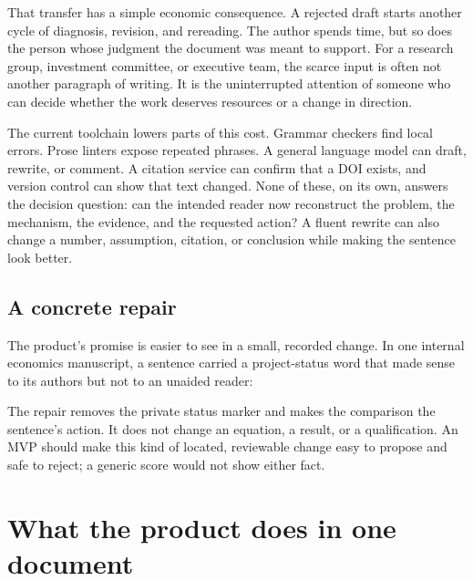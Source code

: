 That transfer has a simple economic consequence. A rejected draft starts
another cycle of diagnosis, revision, and rereading. The author spends time,
but so does the person whose judgment the document was meant to support. For a
research group, investment committee, or executive team, the scarce input is
often not another paragraph of writing. It is the uninterrupted attention of
someone who can decide whether the work deserves resources or a change in
direction.

The current toolchain lowers parts of this cost. Grammar checkers find local
errors. Prose linters expose repeated phrases. A general language model can
draft, rewrite, or comment. A citation service can confirm that a DOI exists,
and version control can show that text changed. None of these, on its own,
answers the decision question: can the intended reader now reconstruct the
problem, the mechanism, the evidence, and the requested action? A fluent
rewrite can also change a number, assumption, citation, or conclusion while
making the sentence look better.

\subsection{A concrete repair}

The product's promise is easier to see in a small, recorded change. In one
internal economics manuscript, a sentence carried a project-status word that
made sense to its authors but not to an unaided reader:

\begin{repairpair}
\end{repairpair}

The repair removes the private status marker and makes the comparison the
sentence's action. It does not change an equation, a result, or a qualification.
An MVP should make this kind of located, reviewable change easy to propose and
safe to reject; a generic score would not show either fact.

\section{What the product does in one document}

